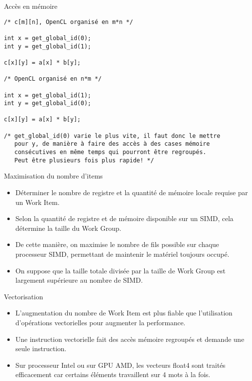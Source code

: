 \documentclass[10pt]{beamer}
\begin{document}
\begin{frame}[fragile]{Accès en mémoire}

  \scriptsize
  \begin{verbatim}
/* c[m][n], OpenCL organisé en m*n */

int x = get_global_id(0);
int y = get_global_id(1);

c[x][y] = a[x] * b[y];

/* OpenCL organisé en n*m */

int x = get_global_id(1);
int y = get_global_id(0);

c[x][y] = a[x] * b[y];

/* get_global_id(0) varie le plus vite, il faut donc le mettre
   pour y, de manière à faire des accès à des cases mémoire
   consécutives en même temps qui pourront être regroupés.
   Peut être plusieurs fois plus rapide! */
  \end{verbatim}
\end{frame}

\begin{frame}{Maximisation du nombre d'items}

  \begin{itemize}
    \item Déterminer le nombre de registre et la quantité de mémoire locale requise par un Work Item. 

    \item Selon la quantité de registre et de mémoire disponible sur un SIMD, cela détermine la taille du Work Group.

    \item De cette manière, on maximise le nombre de fils possible sur chaque processeur SIMD, permettant de maintenir le matériel toujours occupé.

    \item On suppose que la taille totale divisée par la taille de Work Group est largement supérieure au nombre de SIMD.
  \end{itemize}
\end{frame}

\begin{frame}{Vectorisation}

  \begin{itemize}
    \item L'augmentation du nombre de Work Item est plus fiable que l'utilisation d'opérations vectorielles pour augmenter la performance.

    \item Une instruction vectorielle fait des accès mémoire regroupés et demande une seule instruction.

    \item Sur processeur Intel ou sur GPU AMD, les vecteurs float4 sont traités efficacement car certains éléments travaillent sur 4 mots à la fois.
  \end{itemize}
\end{frame}
\end{document}
